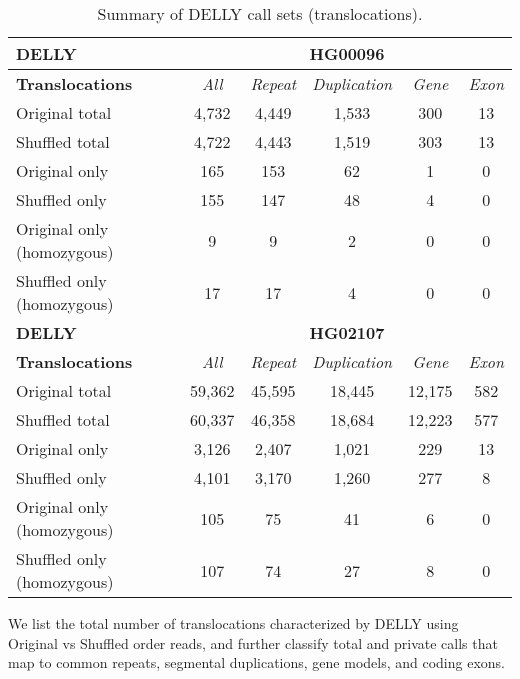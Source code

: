 \begin{table}[htb]
\caption{ Summary of DELLY call sets (translocations). }
\begin{center}
\begin{tabular}{|l|c||c|c|c|c|}
\hline
{\bf DELLY} & \multicolumn{5}{|c|}{\bf HG00096} \\
\hline
\cline{2-6}
{\bf Translocations} & {\it All} & {\it Repeat} & {\it Duplication} & {\it Gene} & {\it Exon} \\
\hline
Original total & 4,732 & 4,449 & 1,533 & 300 & 13\\ 
\hline
Shuffled total & 4,722 & 4,443 & 1,519 & 303 & 13\\ 
\hline
Original only & 165 & 153 & 62 & 1 & 0\\ 
\hline
Shuffled only & 155 & 147 & 48 & 4 & 0\\ 
\hline
Original only (homozygous) & 9 & 9 & 2 & 0 & 0\\ 
\hline
Shuffled only (homozygous) & 17 & 17 & 4 & 0 & 0\\ 
\hline
\hline
{\bf DELLY} & \multicolumn{5}{|c|}{\bf HG02107} \\
\hline
\cline{2-6}
{\bf Translocations} & {\it All} & {\it Repeat} & {\it Duplication} & {\it Gene} & {\it Exon} \\
\hline
Original total & 59,362 & 45,595 & 18,445 & 12,175 & 582\\ 
\hline
Shuffled total & 60,337 & 46,358 & 18,684 & 12,223 & 577\\ 
\hline
Original only & 3,126 & 2,407 & 1,021 & 229 & 13\\ 
\hline
Shuffled only & 4,101 & 3,170 & 1,260 & 277 & 8\\ 
\hline
Original only (homozygous) & 105 & 75 & 41 & 6 & 0\\ 
\hline
Shuffled only (homozygous) & 107 & 74 & 27 & 8 & 0\\ 
\hline
\end{tabular}
\end{center}
{\footnotesize We list the total number of translocations characterized by DELLY using Original vs Shuffled order reads, 
and further classify total and private calls that map to common repeats, segmental duplications, gene models, and coding exons.}
\label{supptab:orig-vs-shuf-delly-trans}
\end{table}

